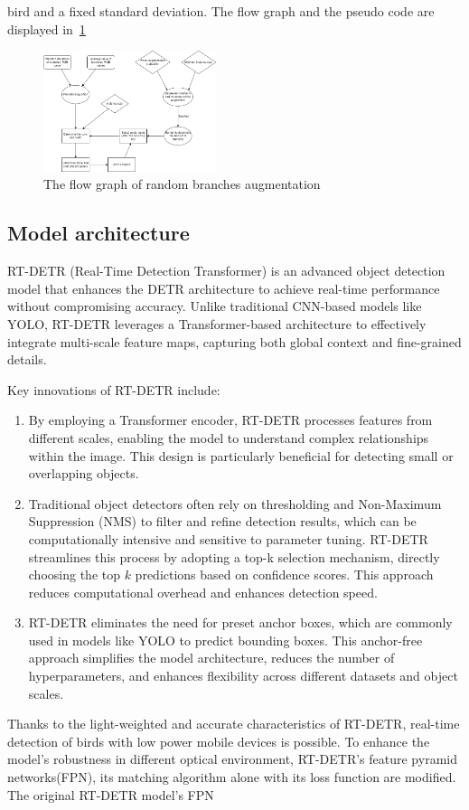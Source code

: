 bird and a fixed standard deviation. The flow graph and the pseudo 
code are displayed in~\ref{png:random-branch}
\begin{figure}[H]
    \includegraphics[width=0.45\textwidth]{bracn_aug.png}
    \caption{The flow graph of random branches augmentation}
    \label{png:random-branch}
\end{figure}
\subsection{Model architecture}
RT-DETR (Real-Time Detection Transformer) is an advanced object detection model that enhances the DETR architecture to achieve real-time performance without compromising accuracy. Unlike traditional CNN-based models like YOLO, RT-DETR leverages a Transformer-based architecture to effectively integrate multi-scale feature maps, capturing both global context and fine-grained details.

Key innovations of RT-DETR include:
\begin{enumerate}
    \item  By employing a Transformer encoder, RT-DETR processes features from different scales, enabling the model to understand complex relationships within the image. This design is particularly beneficial for detecting small or overlapping objects.
    \item  Traditional object detectors often rely on thresholding and Non-Maximum Suppression (NMS) to filter and refine detection results, which can be computationally intensive and sensitive to parameter tuning. RT-DETR streamlines this process by adopting a top-k selection mechanism, directly choosing the top $k$ predictions based on confidence scores. This approach reduces computational overhead and enhances detection speed.
    \item  RT-DETR eliminates the need for preset anchor boxes, which are commonly used in models like YOLO to predict bounding boxes. This anchor-free approach simplifies the model architecture, reduces the number of hyperparameters, and enhances flexibility across different datasets and object scales. 
\end{enumerate}

Thanks to the light-weighted and accurate characteristics of RT-DETR, 
real-time detection of birds with low power mobile devices is possible. 
To enhance the model's robustness in different optical environment, 
RT-DETR's feature pyramid networks(FPN), its matching algorithm alone with its loss function
are modified. The original RT-DETR model's FPN 

